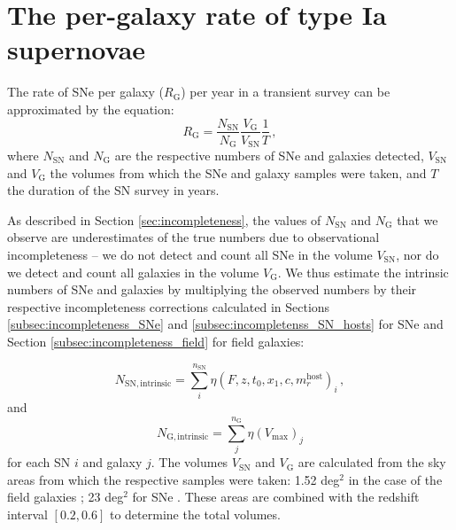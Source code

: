 \documentclass[fleqn,usenatbib]{mnras}
\begin{document}
\section{The per-galaxy rate of type Ia supernovae}
\label{sec:rates}
The rate of SNe per galaxy ($R_{\mathrm{G}}$) per year in a transient survey can be approximated by the equation:
\begin{equation}
    R_{\mathrm{G}} = \frac{N_{\mathrm{SN}}}{N_{\mathrm{G}}} \frac{V_{\mathrm{G}}}{V_{\mathrm{SN}}}\frac{1}{T}\,,
\label{eq:rate1}
\end{equation}
where $N_{\mathrm{SN}}$ and $N_{\mathrm{G}}$ are the respective numbers of SNe and galaxies detected, $V_{\mathrm{SN}}$ and $V_{\mathrm{G}}$ the volumes from which the SNe and galaxy samples were taken, and $T$ the duration of the SN survey in years. 

As described in Section \ref{sec:incompleteness}, the values of $N_{\mathrm{SN}}$ and $N_{\mathrm{G}}$ that we observe are underestimates of the true numbers due to observational incompleteness -- we do not detect and count all SNe in the volume $V_{\mathrm{SN}}$, nor do we detect and count all galaxies in the volume $V_{\mathrm{G}}$. We thus estimate the intrinsic numbers of SNe and galaxies by multiplying the observed numbers by their respective incompleteness corrections calculated in Sections \ref{subsec:incompleteness_SNe} and \ref{subsec:incompletenss_SN_hosts} for SNe and Section \ref{subsec:incompleteness_field} for field galaxies:

\begin{equation}
    N_{\mathrm{SN,intrinsic}} = \sum_i^{n_{\mathrm{SN}}}\eta\left(F,z,t_0,x_1,c,m^{\mathrm{host}}_{r}\right)_{i}\,,
    \label{eq:corr_SN}
\end{equation}
and
\begin{equation}
    N_{\mathrm{G,intrinsic}} = \sum_j^{n_{\mathrm{G}}} \eta\left(V_{\mathrm{max}}\right)_{j} 
    \label{eq:corr_G}
\end{equation}
for each SN $i$ and galaxy $j$. The volumes $V_{\mathrm{SN}}$ and $V_{\mathrm{G}}$ are calculated from the sky areas from which the respective samples were taken: 1.52 deg$^2$ in the case of the field galaxies \citep{Hartley2020}; 23 deg$^2$ for SNe \citep{Smith2020a}. These areas are combined with the redshift interval $[0.2,0.6]$ to determine the total volumes.
\end{document}

